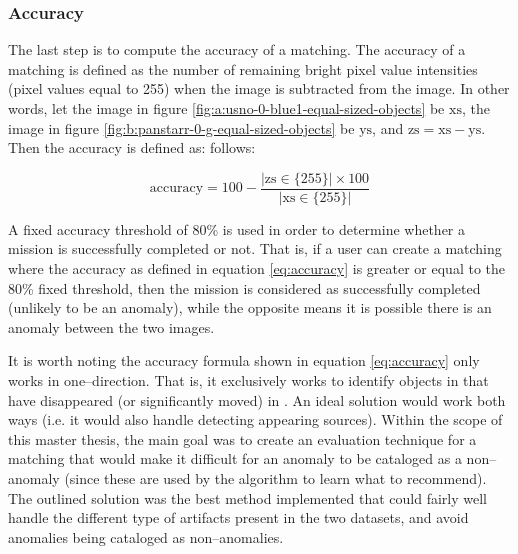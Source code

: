 \subsubsection{Accuracy} \label{subsubsect:case-study:impl:accuracy}
The last step is to compute the accuracy of a matching. The accuracy of a matching is defined as the number of remaining bright pixel value intensities (pixel values equal to 255) when the \usno image is subtracted from the \panstarrs image. In other words, let the \usno image in figure \ref{fig:a:usno-0-blue1-equal-sized-objects} be $\text{xs}$, the \panstarrs image in figure \ref{fig:b:panstarr-0-g-equal-sized-objects} be $\text{ys}$, and $\text{zs}=\text{xs} - \text{ys}$. Then the accuracy is defined as: follows:

\begin{equation} \label{eq:accuracy}
    \text{accuracy} = 100 - \frac{|\text{zs} \in \{255\} | \times 100}{|\text{xs} \in \{255\} |}
\end{equation}

A fixed accuracy threshold of $80$\% is used in order to determine whether a mission is successfully completed or not. That is, if a user can create a matching where the accuracy as defined in equation \ref{eq:accuracy} is greater or equal to the $80$\% fixed threshold, then the mission is considered as successfully completed (unlikely to be an anomaly), while the opposite means it is possible there is an anomaly between the two images. \newline

It is worth noting the accuracy formula shown in equation \ref{eq:accuracy} only works in one--direction. That is, it exclusively works to identify objects in \usno that have disappeared (or significantly moved) in \panstarrs. An ideal solution would work both ways (i.e. it would also handle detecting appearing sources). Within the scope of this master thesis, the main goal was to create an evaluation technique for a matching that would make it difficult for an anomaly to be cataloged as a non--anomaly (since these are used by the \mlblink algorithm to learn what to recommend). The outlined solution was the best method implemented that could fairly well handle the different type of artifacts present in the two datasets, and avoid anomalies being cataloged as non--anomalies.

